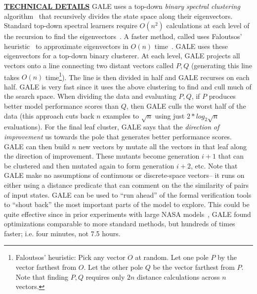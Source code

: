 \documentclass[12pt]{article}
\begin{document}
 
\noindent
\underline{{\bf TECHNICAL DETAILS}} 
GALE uses  a top-down  {\em binary spectral clustering} algorithm~\cite{kamvar03} 
that recursively divides
the state space along their eigenvectors.
Standard top-down spectral learners require  $O(n^2)$ calculations at each level 
of the recursion to find the eigenvectors~\cite{boley98}. A faster method, called  
uses Faloutsos'  heuristic~\cite{Faloutsos1995} to
approximate eigenvectors   in $O(n)$ time~\cite{platt05}.
GALE uses these eigenvectors for a top-down binary clusterer. 
At each level, GALE  projects all  vectors onto a line connecting two distant vectors called $P,Q$ (generating this line takes $O(n)$ time\footnote{Faloutsos’ heuristic: Pick any vector $O$ at random. Let one pole $P$ by the
vector farthest from $O$. Let the other pole $Q$ be the vector farthest from $P$. Note that
finding $P,Q$ requires only $2n$ distance calculations across $n$ vectors.}).
The line is then divided in half
and GALE recurses on each half. 
GALE is very fast since it uses the above clustering to find and cull much of the  search space. When dividing the data and  evaluating   $P,Q$, if $P$ produces better model performance scores than $Q$, then GALE  culls   the worst half of the data (this approach cuts back $n$ examples to $\sqrt{n}$ using just $2*log_2{\sqrt{n}}$ evaluations).  For the final leaf cluster, GALE says that the {\em direction of improvement} us towards the pole that generates better performance scores. GALE can then build $n$ new vectors by mutate all the vectors in that leaf along the direction of improvement. These mutants become generation $i+1$ that can be clustered  and then mutated again to form generation $i+2$, etc. Note that  GALE make no assumptions of continuous or discrete-space vectors-- it runs on either using a distance predicate that can comment on the the similarity of pairs of input states. GALE can be used to ``run ahead'' of the formal verification tools to ``shout back'' the most important parts of the model to explore.  This could be quite effective since
in prior experiments with large NASA models~\cite{me15z}, GALE  found optimizations comparable to more standard methods, but hundreds of times faster; i.e. four minutes, not 7.5 hours.
\end{document}
